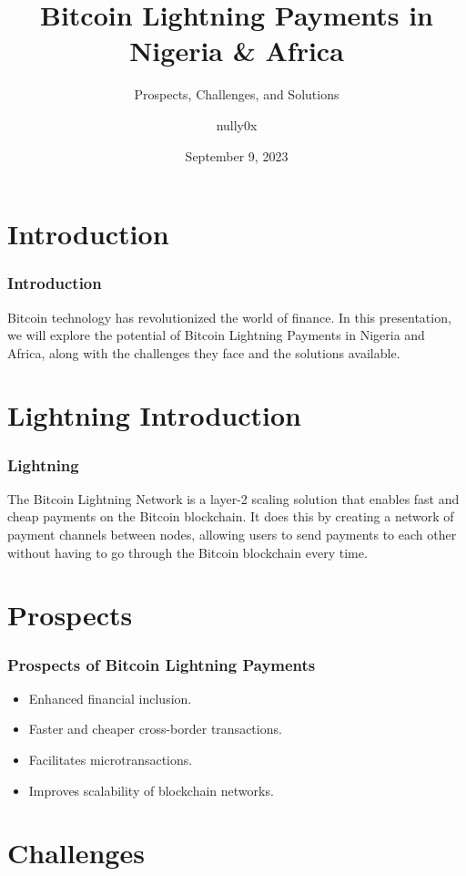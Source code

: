 \documentclass[aspectratio=169]{beamer}
\title[Bitcoin Lightning Payments]{Bitcoin Lightning Payments in Nigeria \& Africa}
\subtitle{Prospects, Challenges, and Solutions}
\author[nully0x]{nully0x}
\date[09/09/23]{September 9, 2023}
\begin{document}
\begin{frame}[plain]
\titlepage
\end{frame}

\section{Introduction}

\begin{frame}
\frametitle{Introduction}
Bitcoin technology has revolutionized the world of finance. In this presentation, we will explore the potential of Bitcoin Lightning Payments in Nigeria and Africa, along with the challenges they face and the solutions available.
\end{frame}

\section{ Lightning Introduction}

\begin{frame}
\frametitle{Lightning}
The Bitcoin Lightning Network is a layer-2 scaling solution that enables fast and cheap payments on the Bitcoin blockchain. It does this by creating a network of payment channels between nodes, allowing users to send payments to each other without having to go through the Bitcoin blockchain every time.
\end{frame}

\section{Prospects}

\begin{frame}
\frametitle{Prospects of Bitcoin Lightning Payments}
\begin{itemize}
    \item Enhanced financial inclusion.
    \item Faster and cheaper cross-border transactions.
    \item Facilitates microtransactions.
    \item Improves scalability of blockchain networks.
\end{itemize}
\end{frame}

\section{Challenges}
\end{document}
